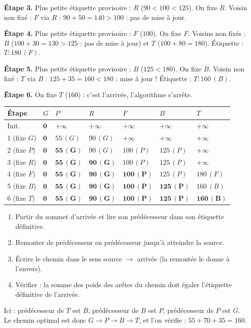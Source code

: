 \documentclass[11pt]{article}
\begin{document}
\textbf{Étape 3.} Plus petite étiquette provisoire : $R$ ($90 < 100 < 125$). On fixe $R$. Voisin non fixé : $F$ via $R$ : $90+50=140 > 100$ : pas de mise à jour.

\textbf{Étape 4.} Plus petite étiquette provisoire : $F$ ($100$). On fixe $F$. Voisins non fixés : $B$ ($100+30=130 > 125$ : pas de mise à jour) et $T$ ($100+80=180$). Étiquette : $T : 180\,(F)$.

\textbf{Étape 5.} Plus petite étiquette provisoire : $B$ ($125 < 180$). On fixe $B$. Voisin non fixé : $T$ via $B$ : $125+35=160 < 180$ : mise à jour ! Étiquette : $T : 160\,(B)$.

\textbf{Étape 6.} On fixe $T$ ($160$) : c'est l'arrivée, l'algorithme s'arrête.

\begin{center}
\begin{tabularx}{\linewidth}{|l|X|X|X|X|X|X|}
\hline
\rowcolor{popblueL} Étape & $G$ & $P$ & $R$ & $F$ & $B$ & $T$ \\
\hline
Init. & $\mathbf{0}$ & $+\infty$ & $+\infty$ & $+\infty$ & $+\infty$ & $+\infty$ \\
\hline
1 (fixe $G$) & $\mathbf{0}$ & $55\,(G)$ & $90\,(G)$ & $+\infty$ & $+\infty$ & $+\infty$ \\
\hline
2 (fixe $P$) & $\mathbf{0}$ & $\mathbf{55\,(G)}$ & $90\,(G)$ & $100\,(P)$ & $125\,(P)$ & $+\infty$ \\
\hline
3 (fixe $R$) & $\mathbf{0}$ & $\mathbf{55\,(G)}$ & $\mathbf{90\,(G)}$ & $100\,(P)$ & $125\,(P)$ & $+\infty$ \\
\hline
4 (fixe $F$) & $\mathbf{0}$ & $\mathbf{55\,(G)}$ & $\mathbf{90\,(G)}$ & $\mathbf{100\,(P)}$ & $125\,(P)$ & $180\,(F)$ \\
\hline
5 (fixe $B$) & $\mathbf{0}$ & $\mathbf{55\,(G)}$ & $\mathbf{90\,(G)}$ & $\mathbf{100\,(P)}$ & $\mathbf{125\,(P)}$ & $160\,(B)$ \\
\hline
6 (fixe $T$) & $\mathbf{0}$ & $\mathbf{55\,(G)}$ & $\mathbf{90\,(G)}$ & $\mathbf{100\,(P)}$ & $\mathbf{125\,(P)}$ & $\mathbf{160\,(B)}$ \\
\hline
\end{tabularx}
\end{center}

\begin{methode}
\begin{enumerate}
\item Partir du sommet d'arrivée et lire son prédécesseur dans son étiquette définitive.
\item Remonter de prédécesseur en prédécesseur jusqu'à atteindre la source.
\item Écrire le chemin dans le sens source $\to$ arrivée (la remontée le donne à l'envers).
\item Vérifier : la somme des poids des arêtes du chemin doit égaler l'étiquette définitive de l'arrivée.
\end{enumerate}
Ici : prédécesseur de $T$ est $B$, prédécesseur de $B$ est $P$, prédécesseur de $P$ est $G$. Le chemin optimal est donc $G \to P \to B \to T$, et l'on vérifie : $55 + 70 + 35 = 160$. 
\end{methode}
\end{document}
